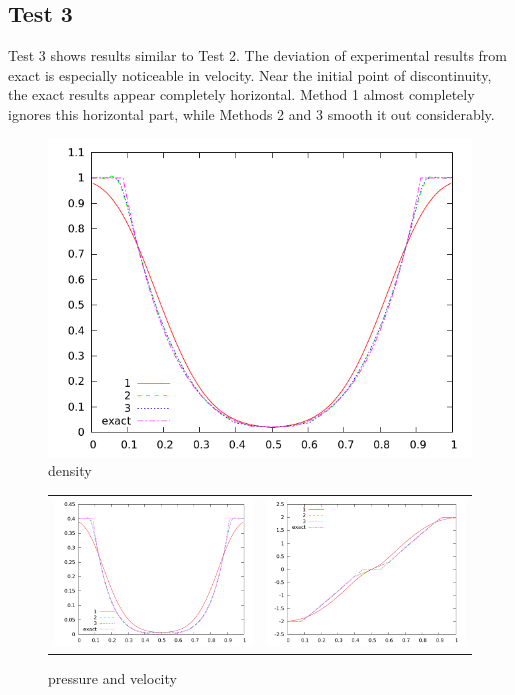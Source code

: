 \documentclass[10pt,preprint]{aastex}
\begin{document}
\clearpage

\subsection{Test 3}
Test 3 shows results similar to Test 2. The deviation of experimental results from exact is especially noticeable in velocity. Near the initial point of discontinuity, the exact results appear completely horizontal. Method 1 almost completely ignores this horizontal part, while Methods 2 and 3 smooth it out considerably. 
\begin{figure}[h]
  \begin{center}
     \includegraphics[width=.78\textwidth]{den_T3.png}	
  \end{center}
  \caption{density}
\end{figure}

\begin{figure}
  \begin{center}
	\begin{tabular}{cc}
      \includegraphics[width=.425\textwidth]{prs_T3.png} &
	  \includegraphics[width=.425\textwidth]{vel_T3.png}
	\end{tabular}
  \end{center}
  \caption{pressure and velocity}
\end{figure}
\end{document}
